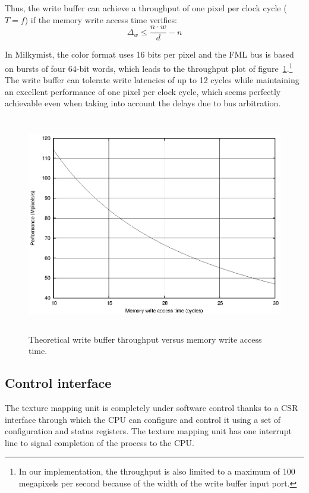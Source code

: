 \documentclass[a4paper,11pt]{kthesis}
\begin{document}
Thus, the write buffer can achieve a throughput of one pixel per clock cycle ($T = f$) if the memory write access time verifies:
\begin{equation}
\Delta_{w} \leq \frac{n \cdot w}{d} - n
\end{equation}

In Milkymist, the color format uses 16 bits per pixel and the FML bus is based on bursts of four 64-bit words, which leads to the throughput plot of figure~\ref{fig:thwbufperf}.\footnote{In our implementation, the throughput is also limited to a maximum of 100 megapixels per second because of the width of the write buffer input port.} The write buffer can tolerate write latencies of up to 12 cycles while maintaining an excellent performance of one pixel per clock cycle, which seems perfectly achievable even when taking into account the delays due to bus arbitration.

\begin{figure}[htp]
\centering
\includegraphics[height=95mm]{thwbufperf.eps}
\caption{Theoretical write buffer throughput versus memory write access time.}
\label{fig:thwbufperf}
\end{figure}

\subsection{Control interface}
\label{subsec:tmucsr}
The texture mapping unit is completely under software control thanks to a CSR interface through which the CPU can configure and control it using a set of configuration and status registers. The texture mapping unit has one interrupt line to signal completion of the process to the CPU.
\end{document}
